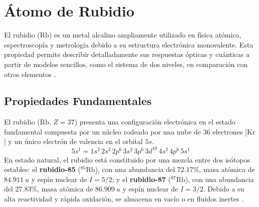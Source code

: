 \appendix
\chapter{Átomo de Rubidio}\label{sec:appendixA}
El rubidio ($\text{Rb}$) es un metal alcalino ampliamente utilizado en física atómica, espectroscopía y metrología debido a su estructura electrónica monovalente. Esta propiedad permite describir detalladamente sus respuestas ópticas y cuánticas a partir de modelos sencillos, como el sistema de dos niveles, en comparación con otros elementos \cite{footAtomicPhysics2005}.
\section{Propiedades Fundamentales}
El rubidio ($\text{Rb}$, $Z = 37$) presenta una configuración electrónica en el estado fundamental compuesta por un núcleo rodeado por una nube de 36 electrones [$\text{Kr}$] y un único electrón de valencia en el orbital $5s$.
\begin{equation*}
    [\text{Kr}]\,5s^1 = 1s^2\,2s^2\,2p^6\,3s^2\,3p^6\,3d^{10}\,4s^2\,4p^6\,5s^1
\end{equation*}
En estado natural, el rubidio está constituido por una mezcla entre dos isótopos estables: el \textbf{rubidio-85} ($^{85}\text{Rb}$), con una abundancia del $72.17\%$, masa atómica de $\SI{84.911}{u}$ y espín nuclear de $I = 5/2$; y el \textbf{rubidio-87} ($^{87}\text{Rb}$), con una abundancia del $27.83\%$, masa atómica de $\SI{86.909}{u}$ y espín nuclear de $I = 3/2$. Debido a su alta reactividad y rápida oxidación, se almacena en vacío o en fluidos inertes \cite{danieladamsteckrubidium85Dlinedata, danieladamsteckrubidium87Dlinedata}.
